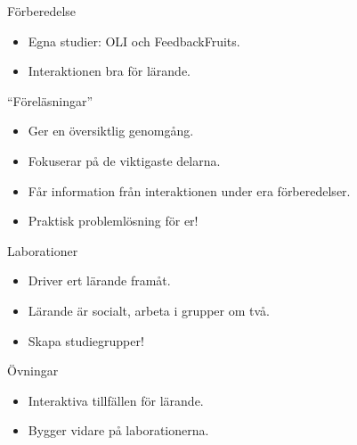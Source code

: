 \begin{frame}
  \begin{block}{Förberedelse}
    \begin{itemize}
      \item Egna studier: OLI och FeedbackFruits.
      \item Interaktionen bra för lärande.
    \end{itemize}
  \end{block}

  \pause
  
  \begin{block}{\enquote{Föreläsningar}}
    \begin{itemize}
      \item Ger en översiktlig genomgång.
      \item Fokuserar på de viktigaste delarna.
      \item Får information från interaktionen under era förberedelser.
      \item Praktisk problemlösning för er!
    \end{itemize}
  \end{block}
\end{frame}

\begin{frame}
  \begin{block}{Laborationer}
    \begin{itemize}
      \item Driver ert lärande framåt.
      \item Lärande är socialt, arbeta i grupper om två.
    \end{itemize}
  \end{block}

  \pause

  \begin{remark}
    \begin{itemize}
      \item Skapa studiegrupper!
    \end{itemize}
  \end{remark}

  \pause

  \begin{block}{Övningar}
    \begin{itemize}
      \item Interaktiva tillfällen för lärande.
      \item Bygger vidare på laborationerna.
    \end{itemize}
  \end{block}
\end{frame}

